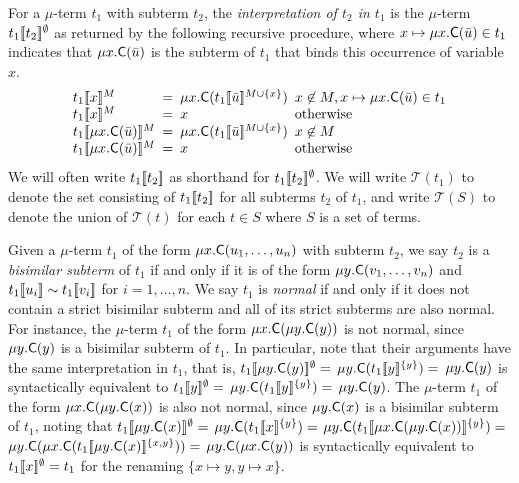 For a $\mu$-term $t_1$ with subterm $t_2$, 
the \emph{interpretation of $t_2$ in $t_1$} is the $\mu$-term $t_1[\![ t_2 ]\!]^\emptyset$ as returned by the following recursive procedure,
where $x \mapsto \mu x. \textsf{C}( \bar u ) \in t_1$ indicates that $\mu x. \textsf{C}( \bar u )$ is the subterm of $t_1$ that binds this occurrence of variable $x$.
\[\begin{array}{l@{\hspace{.5em}}l@{\hspace{.5em}}l@{\hspace{.5em}}l}
t_1\interp{x}^M & = & \mu x. \const{C}( t_1\interp{ \vec u}^{M \cup \{ x \}}) & x \not\in M, x \mapsto \mu x. \const{C}( \vec u ) \in t_1  \\
t_1\interp{x}^M & = & x & \text{otherwise} \\
t_1\interp{\mu x. \const{C}( \vec u )}^M & = & \mu x. \const{C}( t_1\interp{ \vec u }^{M \cup \{ x \}} ) & x \not\in M \\
t_1\interp{\mu x. \const{C}( \vec u )}^M & = & x & \text{otherwise}
\end{array}\]
We will often write $t_1[\![ t_2 ]\!]$ as shorthand for $t_1[\![ t_2 ]\!]^\emptyset$.
We will write $\mathcal{T}( t_1 )$ to denote the set consisting of $t_1[\![ t_2 ]\!]$ for all subterms $t_2$ of $t_1$,
and write $\mathcal{T}( S )$ to denote the union of $\mathcal{T}( t )$ for each $t \in S$ where $S$ is a set of terms.

Given a $\mu$-term $t_1$ of the form $\mu x. \textsf{C}( u_1, \ldots, u_n )$ with subterm $t_2$,
we say $t_2$ is a \emph{bisimilar subterm} of $t_1$ if and only if it is of the form
$\mu y. \textsf{C}( v_1, \ldots, v_n )$ and $t_1[\![  u_i  ]\!] \sim t_1[\![  v_i  ]\!]$ for $i = 1,\ldots, n$.
We say $t_1$ is \emph{normal} if and only if it does not contain a strict bisimilar subterm
and all of its strict subterms are also normal.
For instance, the $\mu$-term $t_1$ of the form $\mu x. \textsf{C}( \mu y. \textsf{C}( y ) )$ is not normal, 
since $\mu y. \textsf{C}( y )$ is a bisimilar subterm of $t_1$.
In particular, note that their arguments have the same interpretation in $t_1$, 
that is,
$t_1[\![ \mu y. \textsf{C}( y ) ]\!]^\emptyset =$ 
$\mu y. \textsf{C}( t_1[\![ y ]\!]^{\{y\}} ) =$ 
$\mu y. \textsf{C}( y )$ 
is syntactically equivalent to
$t_1[\![ y ]\!]^\emptyset =$ 
$\mu y. \textsf{C}( t_1[\![ y ]\!]^{\{y\}} ) =$ 
$\mu y. \textsf{C}( y )$.
The $\mu$-term $t_1$ of the form $\mu x. \textsf{C}( \mu y. \textsf{C}( x ) )$ is also not normal, 
since $\mu y. \textsf{C}( x )$ is a bisimilar subterm of $t_1$,
noting that
$t_1[\![ \mu y. \textsf{C}( x ) ]\!]^\emptyset =$ 
$\mu y. \textsf{C}( t_1[\![ x ]\!]^{\{y\}} ) =$ 
$\mu y. \textsf{C}( t_1[\![ \mu x. \textsf{C}( \mu y. \textsf{C}( x ) )  ]\!]^{\{y\}} ) =$ 
$\mu y. \textsf{C}( \mu x. \textsf{C}( t_1[\![ \mu y. \textsf{C}( x ) ]\!]^{\{x,y\}} ) ) =$ 
$\mu y. \textsf{C}( \mu x. \textsf{C}( y ) )$
is syntactically equivalent to $t_1[\![ x ]\!]^\emptyset = t_1$ for the renaming $\{ x \mapsto y, y \mapsto x \}$.

